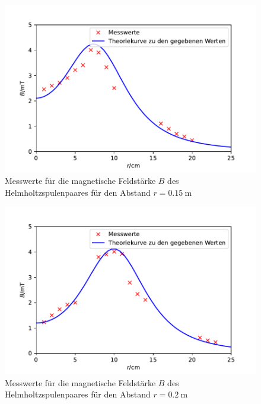 \documentclass[
  bibliography=totoc,     %
  captions=tableheading,  %
  titlepage=firstiscover, %
]{scrartcl}
\begin{document}
  \begin{figure}
    \centering
    \includegraphics{Helmholtz15.pdf}
    \caption{Messwerte für die magnetische Feldstärke $B$ des Helmholtzspulenpaares
              für den Abstand $r=\SI{0.15}{\metre}$}
    \label{fig:helmholtz2}
  \end{figure}
  
  \FloatBarrier

  \begin{figure}
    \centering
    \includegraphics{Helmholtz20.pdf}
    \caption{Messwerte für die magnetische Feldstärke $B$ des 
    Helmholtzspulenpaares für den Abstand $r=\SI{0.2}{\metre}$}
    \label{fig:helmholtz3}
  \end{figure}

  \FloatBarrier
\end{document}
